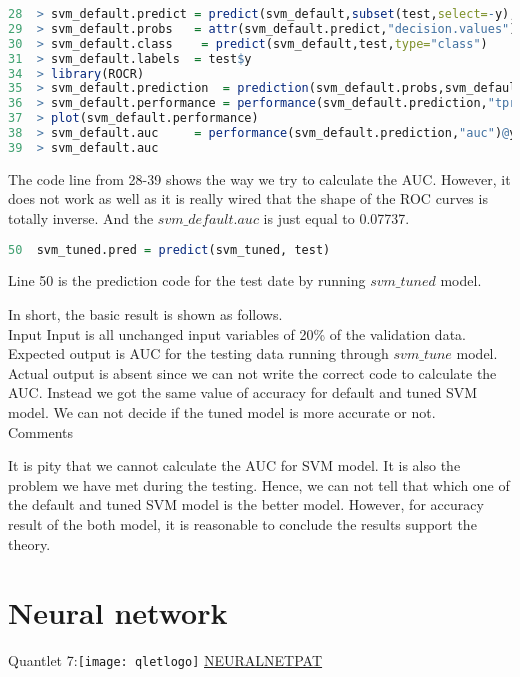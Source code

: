 \documentclass[12pt, a4paper, bibliography=totoc, english]{scrartcl}
\begin{document}
\begin{lstlisting}[language = R]
28  > svm_default.predict = predict(svm_default,subset(test,select=-y),decision.values=TRUE)
29  > svm_default.probs   = attr(svm_default.predict,"decision.values")
30  > svm_default.class    = predict(svm_default,test,type="class")
31  > svm_default.labels  = test$y
34  > library(ROCR)
35  > svm_default.prediction  = prediction(svm_default.probs,svm_default.labels)
36  > svm_default.performance = performance(svm_default.prediction,"tpr","fpr")
37  > plot(svm_default.performance)
38  > svm_default.auc     = performance(svm_default.prediction,"auc")@y.values[[1]]
39  > svm_default.auc
\end{lstlisting}
The code line from 28-39 shows the way we try to calculate the AUC. However, it does not work as well as it is really wired that the shape of the ROC curves is totally inverse. And the $svm\_default.auc$ is just equal to 0.07737.\\

\begin{lstlisting}[language = R]
50  svm_tuned.pred = predict(svm_tuned, test) 
\end{lstlisting}
Line 50 is the prediction code for the test date by running $svm\_tuned$ model.

In short, the basic result is shown as follows.\\
\textbullet\quad Input Input is all unchanged input variables of 20\% of the validation data.\\
\textbullet\quad Expected output is AUC for the testing data running through $svm\_tune$ model.\\
\textbullet\quad Actual output is absent since we can not write the correct code to calculate the AUC. Instead we got the same value of accuracy for default and tuned SVM model. We can not decide if the tuned model is more accurate or not. \\
\textbullet\quad Comments 

It is pity that we cannot calculate the AUC for SVM model. It is also the problem we have met during the testing. Hence, we can not tell that which one of the default and tuned SVM model is the better model. However, for accuracy result of the both model, it is reasonable to conclude the results support the theory.  

\section{Neural network}\label{QNN}
Quantlet 7:\texttt{[image: qletlogo]}
\textcolor{blue}{\href{https://github.com/JingyiLiu3136/MLFBM/tree/master/NEURALNETPAT}{NEURALNETPAT}}\\
\end{document}
